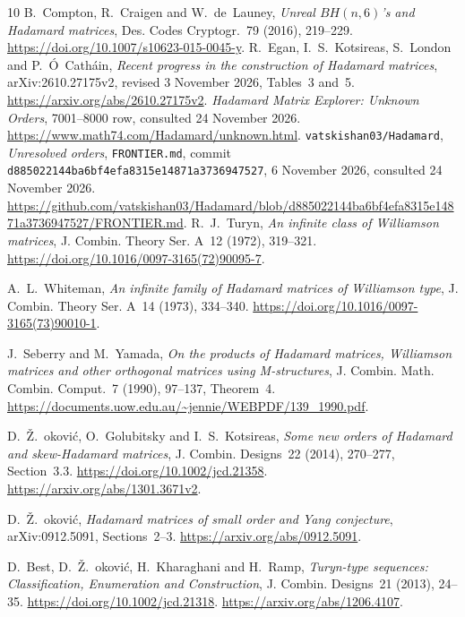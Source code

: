 \documentclass[10pt]{article}
\begin{document}
\begin{thebibliography}{10}
B.~Compton, R.~Craigen and W.~de~Launey,
\emph{Unreal $BH(n,6)$'s and Hadamard matrices},
Des. Codes Cryptogr.\ 79 (2016), 219--229.
\url{https://doi.org/10.1007/s10623-015-0045-y}.
R.~Egan, I.~S.~Kotsireas, S.~London and P.~\'{O}~Cath\'ain,
\emph{Recent progress in the construction of Hadamard matrices},
arXiv:2610.27175v2, revised 3 November 2026, Tables~3 and~5.
\url{https://arxiv.org/abs/2610.27175v2}.
\emph{Hadamard Matrix Explorer: Unknown Orders},
7001--8000 row, consulted 24 November 2026.
\url{https://www.math74.com/Hadamard/unknown.html}.
\texttt{vatskishan03/Hadamard}, \emph{Unresolved orders},
\texttt{FRONTIER.md}, commit \texttt{d885022144ba6bf4efa8315e14871a3736947527},
6 November 2026, consulted 24 November 2026.
\url{https://github.com/vatskishan03/Hadamard/blob/d885022144ba6bf4efa8315e14871a3736947527/FRONTIER.md}.
R.~J.~Turyn, \emph{An infinite class of Williamson matrices},
J. Combin. Theory Ser. A\ 12 (1972), 319--321.
\url{https://doi.org/10.1016/0097-3165(72)90095-7}.

A.~L.~Whiteman,
\emph{An infinite family of Hadamard matrices of Williamson type},
J. Combin. Theory Ser. A\ 14 (1973), 334--340.
\url{https://doi.org/10.1016/0097-3165(73)90010-1}.

J.~Seberry and M.~Yamada,
\emph{On the products of Hadamard matrices, Williamson matrices and other
orthogonal matrices using M-structures},
J. Combin. Math. Combin. Comput.\ 7 (1990), 97--137, Theorem~4.
\url{https://documents.uow.edu.au/~jennie/WEBPDF/139_1990.pdf}.

D.~\v{Z}.~\DJ{}okovi\'c, O.~Golubitsky and I.~S.~Kotsireas,
\emph{Some new orders of Hadamard and skew-Hadamard matrices},
J. Combin. Designs\ 22 (2014), 270--277, Section~3.3.
\url{https://doi.org/10.1002/jcd.21358}.
\url{https://arxiv.org/abs/1301.3671v2}.

D.~\v{Z}.~\DJ{}okovi\'c,
\emph{Hadamard matrices of small order and Yang conjecture},
arXiv:0912.5091, Sections~2--3.
\url{https://arxiv.org/abs/0912.5091}.

D.~Best, D.~\v{Z}.~\DJ{}okovi\'c, H.~Kharaghani and H.~Ramp,
\emph{Turyn-type sequences: Classification, Enumeration and Construction},
J. Combin. Designs\ 21 (2013), 24--35.
\url{https://doi.org/10.1002/jcd.21318}.
\url{https://arxiv.org/abs/1206.4107}.

\end{thebibliography}
\end{document}
